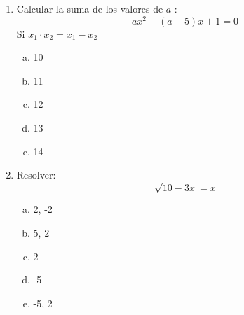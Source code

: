 \documentclass[12pt, a5paper]{article}
\begin{document}
\begin{enumerate}
	\item{Calcular la suma de los valores de $a$ :
	$$ax^2 - (a - 5)x + 1 = 0$$
	Si $x_1 \cdot x_2 = x_1 - x_2$
		\begin{enumerate}[a) ]
			\item{10}
			\item{11}
			\item{12}
			\item{13}
			\item{14} %
		\end{enumerate}
	}
	\item{Resolver: $$\sqrt{10 - 3x} = x$$
		\begin{enumerate}[a) ]
			\item{2, -2}
			\item{5, 2}
			\item{2} %
			\item{-5}
			\item{-5, 2} 
		\end{enumerate}
	}
\end{enumerate}
\end{document}
